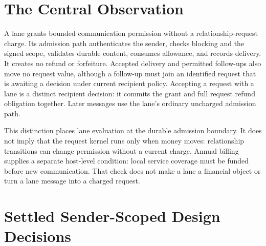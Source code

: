 \documentclass[11pt]{article}
\begin{document}
\section{The Central Observation}

A lane grants bounded communication permission without a relationship-request
charge. Its admission path authenticates the sender, checks blocking and the
signed scope, validates durable content, consumes allowance, and records delivery.
It creates no refund or forfeiture. Accepted delivery and permitted follow-ups
also move no request value, although a follow-up must join an identified request
that is awaiting a decision under current recipient policy.
Accepting a request with a lane is a distinct recipient decision: it commits the
grant and full request refund obligation together. Later messages use the lane's
ordinary uncharged admission path.

This distinction places lane evaluation at the durable admission boundary. It
does not imply that the request kernel runs only when money moves: relationship
transitions can change permission without a current charge. Annual billing supplies a separate host-level condition: local service coverage
must be funded before new communication. That check does not make a lane a
financial object or turn a lane message into a charged request.

\section{Settled Sender-Scoped Design Decisions}
\end{document}
